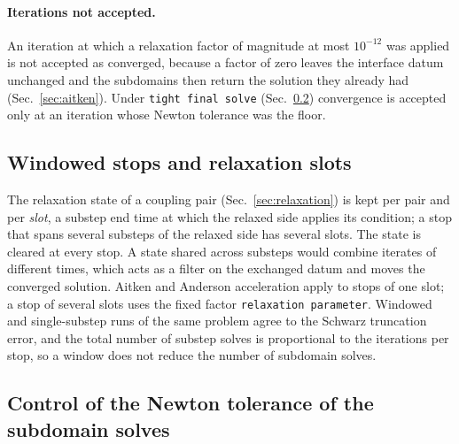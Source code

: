 \documentclass[11pt]{article}
\newcommand{\code}[1]{\texttt{#1}}
\begin{document}
\paragraph{Iterations not accepted.} An iteration at which a relaxation factor of magnitude
at most $10^{-12}$ was applied is not accepted as converged, because a
factor of zero leaves the interface datum unchanged and the subdomains then
return the solution they already had (Sec.~\ref{sec:aitken}). Under
\code{tight final solve} (Sec.~\ref{sec:inexact-newton}) convergence is
accepted only at an iteration whose Newton tolerance was the floor.

\subsection{Windowed stops and relaxation slots}
\label{sec:slots}

The relaxation state of a coupling pair (Sec.~\ref{sec:relaxation}) is kept
per pair and per \emph{slot}, a substep end time at which the relaxed side
applies its condition; a stop that spans several substeps of the relaxed
side has several slots. The state is cleared at every stop. A state shared
across substeps would combine iterates of different times, which acts as
a filter on the exchanged datum and moves the converged solution. Aitken and
Anderson acceleration apply to stops of one slot; a stop of several slots
uses the fixed factor \code{relaxation parameter}. Windowed and
single-substep runs of the same problem agree to the Schwarz truncation
error, and the total number of substep solves is proportional to the
iterations per stop, so a window does not reduce the number of subdomain
solves.

\subsection{Control of the Newton tolerance of the subdomain solves}
\label{sec:inexact-newton}
\end{document}
